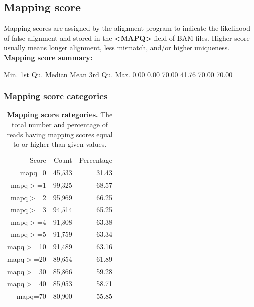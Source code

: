 \documentclass{article}
\begin{document}
\subsection{Mapping score}
Mapping scores are assigned by the alignment program to indicate the likelihood of false alignment and stored in the \textbf{<MAPQ>} field of BAM files. Higher score usually means longer alignment, less mismatch, and/or higher uniqueness. 
\vspace*{1\baselineskip}
\\{\textbf{Mapping score summary:}}
\begin{Schunk}
\begin{Soutput}
   Min. 1st Qu.  Median    Mean 3rd Qu.    Max. 
   0.00    0.00   70.00   41.76   70.00   70.00 
\end{Soutput}
\end{Schunk}

\subsubsection{Mapping score categories}
\vspace*{1\baselineskip}
\begin{table}
\begin{tabular}{|r|r|r|}
  \hline
Score & Count & Percentage \\ 
  \rowcolor[gray]{0.9} \hline
mapq=0 & 45,533 & 31.43 \\ 
  mapq$>$=1 & 99,325 & 68.57 \\ 
   \rowcolor[gray]{0.9}mapq$>$=2 & 95,969 & 66.25 \\ 
  mapq$>$=3 & 94,514 & 65.25 \\ 
   \rowcolor[gray]{0.9}mapq$>$=4 & 91,808 & 63.38 \\ 
  mapq$>$=5 & 91,759 & 63.34 \\ 
   \rowcolor[gray]{0.9}mapq$>$=10 & 91,489 & 63.16 \\ 
  mapq$>$=20 & 89,654 & 61.89 \\ 
   \rowcolor[gray]{0.9}mapq$>$=30 & 85,866 & 59.28 \\ 
  mapq$>$=40 & 85,053 & 58.71 \\ 
   \rowcolor[gray]{0.9}mapq=70 & 80,900 & 55.85 \\ 
   \hline
\end{tabular}\caption{\textbf{Mapping score categories.} The total number and percentage of reads having mapping scores equal to or higher than given values.}
\end{table}
\end{document}
